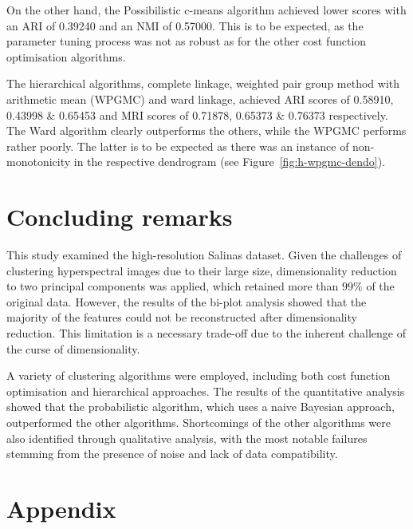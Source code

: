 \documentclass[
  course = {{DS12E Clustering Algorithms}},
  quartile = {{2}},
  assignment = ,
  name = {{Michael Darmanis ; Vasilios Venieris}},
  studentnumber = {{7115152200004 ; 7115152200017}},
  email = {{mdarm@di.uoa.gr ; vvenieris@di.uoa.gr}},
  firstexercise = 1
]{aga-homework}
\begin{document}
On the other hand, the Possibilistic c-means algorithm achieved lower scores with an ARI of 0.39240 and an NMI of 0.57000. This is to be expected, as the parameter tuning process was not as robust as for the other cost function optimisation algorithms.

The hierarchical algorithms, complete linkage, weighted pair group method with arithmetic mean (WPGMC) and ward linkage, achieved ARI scores of 0.58910, 0.43998 \& 0.65453 and MRI scores of 0.71878, 0.65373 \& 0.76373 respectively. The Ward algorithm clearly outperforms the others, while the WPGMC performs rather poorly. The latter is to be expected as there was an instance of non-monotonicity in the respective dendrogram (see Figure~\ref{fig:h-wpgmc-dendo}).

\FloatBarrier
\section{Concluding remarks}

This study examined the high-resolution Salinas dataset. Given the challenges of clustering hyperspectral images due to their large size, dimensionality reduction to two principal components was applied, which retained more than $99\%$ of the original data. However, the results of the bi-plot analysis \cite{biplot} showed that the majority of the features could not be reconstructed after dimensionality reduction. This limitation is a necessary trade-off due to the inherent challenge of the curse of dimensionality.

A variety of clustering algorithms were employed, including both cost function optimisation and hierarchical approaches. The results of the quantitative analysis showed that the probabilistic algorithm, which uses a naive Bayesian approach, outperformed the other algorithms. Shortcomings of the other algorithms were also identified through qualitative analysis, with the most notable failures stemming from the presence of noise and lack of data compatibility.

\printbibliography[heading=bibintoc]

\section{Appendix}




\end{document}
